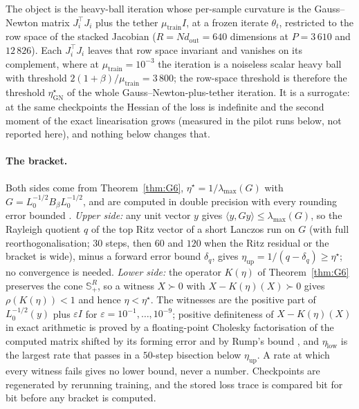 \documentclass[11pt]{article}
\theoremstyle{remark}
\begin{document}
The object is the heavy-ball iteration whose per-sample curvature is the Gauss--Newton matrix $J_i^\top J_i$ plus the tether $\mu_{\mathrm{train}}I$, at a frozen iterate $\theta_t$, restricted to the row space of the stacked Jacobian ($R=N d_{\mathrm{out}}=640$ dimensions at $P=3\,610$ and $12\,826$). Each $J_i^\top J_i$ leaves that row space invariant and vanishes on its complement, where at $\mu_{\mathrm{train}}=10^{-3}$ the iteration is a noiseless scalar heavy ball with threshold $2(1+\beta)/\mu_{\mathrm{train}}=3\,800$; the row-space threshold is therefore the threshold $\eta^\star_{\mathrm{GN}}$ of the whole Gauss--Newton-plus-tether iteration. It is a surrogate: at the same checkpoints the Hessian of the loss is indefinite and the second moment of the exact linearisation grows (measured in the pilot runs below, not reported here), and nothing below changes that.

\paragraph{The bracket.} Both sides come from Theorem~\ref{thm:G6}, $\eta^\star=1/\lambda_{\max}(G)$ with $G=L_0^{-1/2}B_\beta L_0^{-1/2}$, and are computed in double precision with every rounding error bounded \citep[Chapter~3]{higham2002accuracy}. \emph{Upper side:} any unit vector $y$ gives $\langle y,Gy\rangle\le\lambda_{\max}(G)$, so the Rayleigh quotient $q$ of the top Ritz vector of a short Lanczos run on $G$ (with full reorthogonalisation; $30$ steps, then $60$ and $120$ when the Ritz residual or the bracket is wide), minus a forward error bound $\delta_q$, gives $\eta_{\mathrm{up}}=1/(q-\delta_q)\ge\eta^\star$; no convergence is needed. \emph{Lower side:} the operator $K(\eta)$ of Theorem~\ref{thm:G6} preserves the cone $\mathbb S_+^R$, so a witness $X\succ0$ with $X-K(\eta)(X)\succ0$ gives $\rho(K(\eta))<1$ \citep[Theorem~4.2]{vandergraft1968cones} and hence $\eta<\eta^\star$. The witnesses are the positive part of $L_0^{-1/2}(y)$ plus $\varepsilon I$ for $\varepsilon=10^{-1},\dots,10^{-9}$; positive definiteness of $X-K(\eta)(X)$ in exact arithmetic is proved by a floating-point Cholesky factorisation of the computed matrix shifted by its forming error and by Rump's bound \citep{rump2006posdef}, and $\eta_{\mathrm{low}}$ is the largest rate that passes in a $50$-step bisection below $\eta_{\mathrm{up}}$. A rate at which every witness fails gives no lower bound, never a number. Checkpoints are regenerated by rerunning training, and the stored loss trace is compared bit for bit before any bracket is computed.
\end{document}
